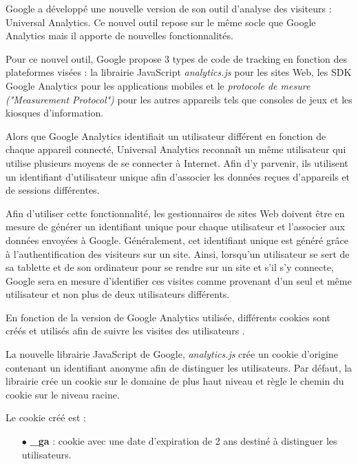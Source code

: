 Google a développé une nouvelle version de son outil d'analyse des visiteurs : Universal Analytics. Ce nouvel outil repose sur le même socle que Google Analytics mais il apporte de nouvelles fonctionnalités.

Pour ce nouvel outil, Google propose 3 types de code de tracking en fonction des plateformes visées : la librairie JavaScript \textit{analytics.js} pour les sites Web, les SDK Google Analytics pour les applications mobiles et le \textit{protocole de mesure ("Measurement Protocol")} pour les autres appareils tels que consoles de jeux et les kiosques d'information.
\newline

Alors que Google Analytics identifiait un utilisateur différent en fonction de chaque appareil connecté, Universal Analytics reconnaît un même utilisateur qui utilise plusieurs moyens de se connecter à Internet. Afin d'y parvenir, ils utilisent un identifiant d'utilisateur unique afin d'associer les données reçues d'appareils et de sessions différentes.

Afin d'utiliser cette fonctionnalité, les gestionnaires de sites Web doivent être en mesure de générer un identifiant unique pour chaque utilisateur et l'associer aux données envoyées à Google. Généralement, cet identifiant unique est généré grâce à l'authentification des visiteurs sur un site. Ainsi, lorsqu'un utilisateur se sert de sa tablette et de son ordinateur pour se rendre sur un site et s'il s'y connecte, Google sera en mesure d'identifier ces visites comme provenant d'un seul et même utilisateur et non plus de deux utilisateurs différents.
\newline

En fonction de la version de Google Analytics utilisée, différents cookies sont créés et utilisés afin de suivre les visites des utilisateurs \cite{Google_Analytics_cookies}.
\newline

La nouvelle librairie JavaScript de Google, \textit{analytics.js} crée un cookie d'origine contenant un identifiant anonyme afin de distinguer les utilisateurs. Par défaut, la librairie crée un cookie sur le domaine de plus haut niveau et règle le chemin du cookie sur le niveau racine.

Le cookie créé est :
\begin{itemize}
  \item[$\bullet$] \textbf{\_ga} : cookie avec une date d'expiration de 2 ans destiné à distinguer les utilisateurs.
  \newline
\end{itemize}


